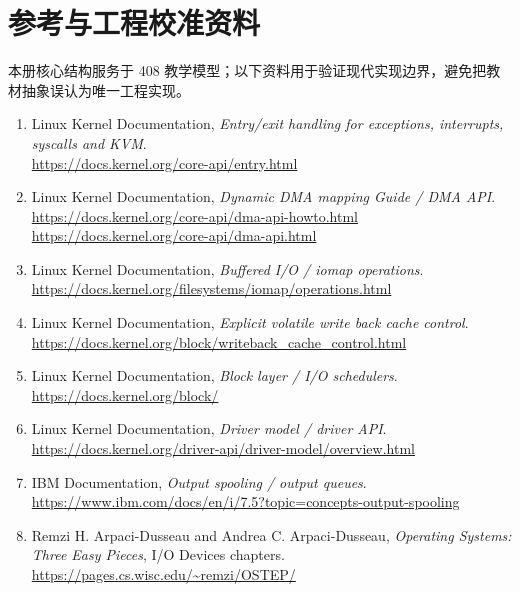 \documentclass[11pt,a4paper]{ctexart}
\begin{document}
\section*{参考与工程校准资料}
本册核心结构服务于 408 教学模型；以下资料用于验证现代实现边界，避免把教材抽象误认为唯一工程实现。
\begin{enumerate}
  \item Linux Kernel Documentation, \emph{Entry/exit handling for exceptions, interrupts, syscalls and KVM}.\\
  \url{https://docs.kernel.org/core-api/entry.html}
  \item Linux Kernel Documentation, \emph{Dynamic DMA mapping Guide / DMA API}.\\
  \url{https://docs.kernel.org/core-api/dma-api-howto.html}\\
  \url{https://docs.kernel.org/core-api/dma-api.html}
  \item Linux Kernel Documentation, \emph{Buffered I/O / iomap operations}.\\
  \url{https://docs.kernel.org/filesystems/iomap/operations.html}
  \item Linux Kernel Documentation, \emph{Explicit volatile write back cache control}.\\
  \url{https://docs.kernel.org/block/writeback_cache_control.html}
  \item Linux Kernel Documentation, \emph{Block layer / I/O schedulers}.\\
  \url{https://docs.kernel.org/block/}
  \item Linux Kernel Documentation, \emph{Driver model / driver API}.\\
  \url{https://docs.kernel.org/driver-api/driver-model/overview.html}
  \item IBM Documentation, \emph{Output spooling / output queues}.\\
  \url{https://www.ibm.com/docs/en/i/7.5?topic=concepts-output-spooling}
  \item Remzi H. Arpaci-Dusseau and Andrea C. Arpaci-Dusseau, \emph{Operating Systems: Three Easy Pieces}, I/O Devices chapters.\\
  \url{https://pages.cs.wisc.edu/~remzi/OSTEP/}
\end{enumerate}
\end{document}
